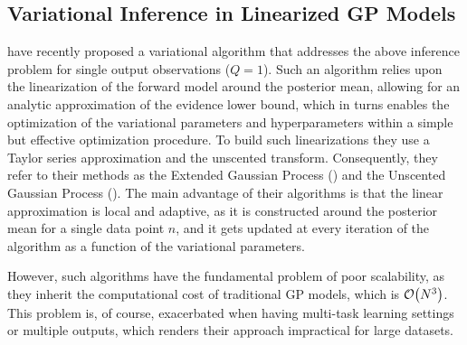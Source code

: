 \subsection{Variational Inference in Linearized GP Models}
\citet{steinberg-bonilla-nips-2014} have recently proposed a variational  algorithm that
addresses the above inference problem for single output observations ($Q=1$).  
Such an algorithm relies upon the linearization of the forward model around the posterior 
mean, allowing for an analytic approximation of the evidence lower bound, which in turns 
enables the optimization of the variational parameters and hyperparameters within a simple 
but effective optimization procedure.  
%
To build such linearizations they use a Taylor series approximation and the
unscented transform.
Consequently, they refer to their methods  as the Extended Gaussian Process (\egp) and 
the Unscented Gaussian Process (\ugp). 
The main advantage of their algorithms is that the linear
approximation is local and adaptive, as it is constructed around the posterior mean for a
single data point $n$, and it gets updated at every iteration of the algorithm as a function
of the variational parameters. 

However, such algorithms have the fundamental problem of poor scalability, as they 
inherit the computational cost of traditional GP models, which is $\mathcal{O}\!\left({{N^3}}\right)$. This 
problem is, of course, exacerbated when having multi-task learning settings or multiple
outputs, which renders their approach impractical for large datasets.  


